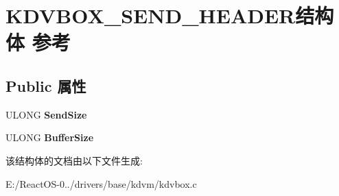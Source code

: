 \hypertarget{struct_k_d_v_b_o_x___s_e_n_d___h_e_a_d_e_r}{}\section{K\+D\+V\+B\+O\+X\+\_\+\+S\+E\+N\+D\+\_\+\+H\+E\+A\+D\+E\+R结构体 参考}
\label{struct_k_d_v_b_o_x___s_e_n_d___h_e_a_d_e_r}
\subsection*{Public 属性}
\begin{DoxyCompactItemize}
\item 
\mbox{\label{struct_k_d_v_b_o_x___s_e_n_d___h_e_a_d_e_r_a059e05a9b8da2fef90127f405d92730b}} 
U\+L\+O\+NG {\bfseries Send\+Size}
\item 
\mbox{\label{struct_k_d_v_b_o_x___s_e_n_d___h_e_a_d_e_r_a3ba8cec555b264343443e05b4e7bfdea}} 
U\+L\+O\+NG {\bfseries Buffer\+Size}
\end{DoxyCompactItemize}


该结构体的文档由以下文件生成\+:\begin{DoxyCompactItemize}
\item 
E\+:/\+React\+O\+S-\/0../drivers/base/kdvm/kdvbox.\+c\end{DoxyCompactItemize}
